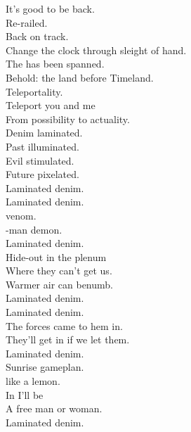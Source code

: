 
\label{album:laminated-denim}





It's good to be back. \\
Re-railed. \\
Back on track. \\
Change the clock through sleight of hand. \\
The  has been spanned. \\
Behold: the land before Timeland. \\

Teleportality. \\
Teleport you and me \\
From possibility to actuality. \\
Denim laminated. \\
Past illuminated. \\
Evil stimulated. \\
Future pixelated. \\

Laminated denim. \\

Laminated denim. \\
 venom. \\
-man demon. \\
Laminated denim. \\
Hide-out in the plenum \\
Where they can't get us. \\
Warmer air can benumb. \\
Laminated denim. \\

Laminated denim. \\
The forces came to hem in. \\
They'll get in if we let them. \\
Laminated denim. \\
Sunrise gameplan. \\
 like a lemon. \\
In  I'll be \\
A free man or woman. \\
Laminated denim. \\

